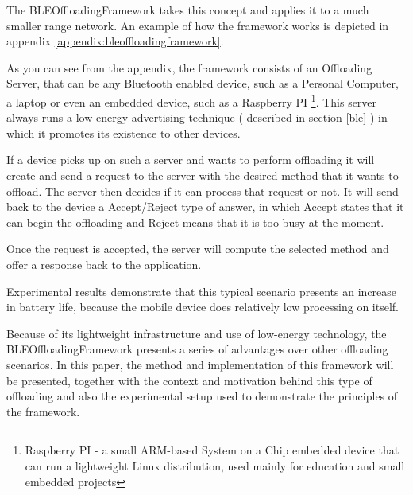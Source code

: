 The BLEOffloadingFramework takes this concept and applies it to a much smaller range network. An example of how the framework works is depicted in appendix \ref{appendix:bleoffloadingframework}.

As you can see from the appendix, the framework consists of an Offloading Server, that can be any Bluetooth enabled device, such as a Personal Computer, a laptop or even an embedded device, such as a Raspberry PI \footnote{Raspberry PI - a small ARM-based System on a Chip embedded device that can run a lightweight Linux distribution, used mainly for education and small embedded projects}. This server always runs a low-energy advertising technique ( described in section \ref{ble} ) in which it promotes its existence to other devices.

If a device picks up on such a server and wants to perform offloading it will create and send a request to the server with the desired method that it wants to offload. The server then decides if it can process that request or not. It will send back to the device a Accept/Reject type of answer, in which Accept states that it can begin the offloading and Reject means that it is too busy at the moment.

Once the request is accepted, the server will compute the selected method and offer a response back to the application. 

Experimental results demonstrate that this typical scenario presents an increase in battery life, because the mobile device does relatively low processing on itself.

Because of its lightweight infrastructure and use of low-energy technology, the BLEOffloadingFramework presents a series of advantages over other offloading scenarios. In this paper, the method and implementation of this framework will be presented, together with the context and motivation behind this type of offloading and also the experimental setup used to demonstrate the principles of the framework.







